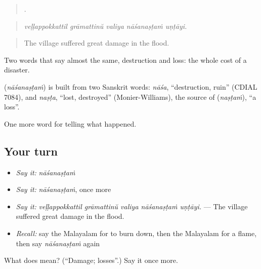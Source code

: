 \begin{quote}
    .
\end{quote}

\begin{quote}
\emph{veḷḷappokkattil grāmattinŭ valiya nāśanaṣṭaṁ uṇṭāyi.}
\end{quote}

\begin{quote}
The village suffered great damage in the flood.
\end{quote}

Two words that say almost the same, destruction and loss: the whole cost of a disaster.

\begin{cousinweb}
\textbf{} (\emph{nāśanaṣṭaṁ}) is built from two Sanskrit words: \emph{nāśa}, \textquotedblleft{}destruction, ruin\textquotedblright{} (CDIAL 7084), and \emph{naṣṭa}, \textquotedblleft{}lost, destroyed\textquotedblright{} (Monier-Williams), the source of  (\emph{naṣṭaṁ}), \textquotedblleft{}a loss\textquotedblright{}.
\end{cousinweb}

\begin{grammarlens}[title={What you've built}]
One more word for telling what happened.
\end{grammarlens}

\subsection*{Your turn}
\begin{itemize}
\raggedright
  \item \emph{Say it:} \emph{nāśanaṣṭaṁ}
  \item \emph{Say it:} \emph{nāśanaṣṭaṁ}, once more
  \item \emph{Say it:} \emph{veḷḷappokkattil grāmattinŭ valiya nāśanaṣṭaṁ uṇṭāyi.} — The village suffered great damage in the flood.
  \item \emph{Recall:} say the Malayalam for to burn down, then the Malayalam for a flame, then say \emph{nāśanaṣṭaṁ} again
\end{itemize}

\begin{tcolorbox}[breakable,colback=teal!4,colframe=teal!35!black,title={Before you move on}]
What does  mean? (\textquotedblleft{}Damage; losses\textquotedblright{}.) Say it once more.
\end{tcolorbox}
